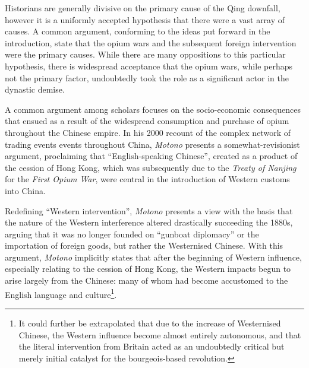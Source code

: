 \documentclass[a4paper,oneside]{article}
\begin{document}
Historians are generally divisive on the primary cause of the Qing downfall,
however it is a uniformly accepted hypothesis that there were a vast array of
causes. A common argument, conforming to the ideas put forward in the
introduction, state that the opium wars and the subsequent foreign intervention
were the primary causes. While there are many oppositions to this particular
hypothesis, there is widespread acceptance that the opium wars, while perhaps
not the primary factor, undoubtedly took the role as a significant actor in the
dynastic demise.

A common argument among scholars focuses on the socio-economic consequences that
ensued as a result of the widespread consumption and purchase of opium
throughout the Chinese empire. In his 2000 recount of the complex network of
trading events events throughout China, \textit{Motono} presents a
somewhat-revisionist argument, proclaiming that ``English-speaking Chinese'',
created as a product of the cession of Hong Kong, which was subsequently due to
the \textit{Treaty of Nanjing} for the \textit{First Opium War}, were central in
the introduction of Western customs into China.

Redefining ``Western intervention'', \textit{Motono} presents a view with the
basis that the nature of the Western interference altered drastically succeeding
the 1880s, arguing that it was no longer founded on ``gunboat diplomacy'' or the
importation of foreign goods, but rather the Westernised Chinese. With this
argument, \textit{Motono} implicitly states that after the beginning of Western
influence, especially relating to the cession of Hong Kong, the Western impacts
begun to arise largely from the Chinese: many of whom had become accustomed to
the English language and culture\footnote{It could further be extrapolated that
due to the increase of Westernised Chinese, the Western influence become almost
entirely autonomous, and that the literal intervention from Britain acted as an
undoubtedly critical but merely initial catalyst for the bourgeois-based
revolution.}.
\end{document}

